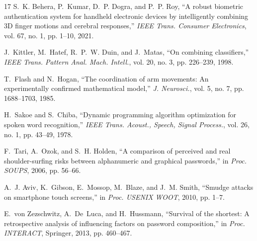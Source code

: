 \documentclass[conference]{IEEEtran}
\begin{document}
\begin{thebibliography}{17}
S.~K. Behera, P.~Kumar, D.~P. Dogra, and P.~P. Roy, ``A robust biometric authentication system for handheld electronic devices by intelligently combining 3D finger motions and cerebral responses,'' \textit{IEEE Trans. Consumer Electronics}, vol. 67, no. 1, pp. 1--10, 2021.

J.~Kittler, M.~Hatef, R.~P.~W. Duin, and J.~Matas, ``On combining classifiers,'' \textit{IEEE Trans. Pattern Anal. Mach. Intell.}, vol. 20, no. 3, pp. 226--239, 1998.

T.~Flash and N.~Hogan, ``The coordination of arm movements: An experimentally confirmed mathematical model,'' \textit{J. Neurosci.}, vol. 5, no. 7, pp. 1688--1703, 1985.

H.~Sakoe and S.~Chiba, ``Dynamic programming algorithm optimization for spoken word recognition,'' \textit{IEEE Trans. Acoust., Speech, Signal Process.}, vol. 26, no. 1, pp. 43--49, 1978.

F.~Tari, A.~Ozok, and S.~H. Holden, ``A comparison of perceived and real shoulder-surfing risks between alphanumeric and graphical passwords,'' in \textit{Proc. SOUPS}, 2006, pp. 56--66.

A.~J. Aviv, K.~Gibson, E.~Mossop, M.~Blaze, and J.~M. Smith, ``Smudge attacks on smartphone touch screens,'' in \textit{Proc. USENIX WOOT}, 2010, pp. 1--7.

E.~von Zezschwitz, A.~De~Luca, and H.~Hussmann, ``Survival of the shortest: A retrospective analysis of influencing factors on password composition,'' in \textit{Proc. INTERACT}, Springer, 2013, pp. 460--467.

\end{thebibliography}
\end{document}
